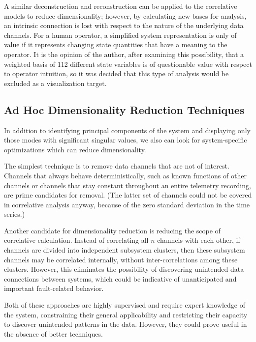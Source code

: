 A similar deconstruction and reconstruction can be applied to the correlative models to reduce dimensionality; however, by calculating new bases for analysis, an intrinsic connection is lost with respect to the nature of the underlying data channels. For a human operator, a simplified system representation is only of value if it represents changing state quantities that have a meaning to the operator. It is the opinion of the author, after examining this possibility, that a weighted basis of 112 different state variables is of questionable value with respect to operator intuition, so it was decided that this type of analysis would be excluded as a visualization target.

\subsection{Ad Hoc Dimensionality Reduction Techniques}

In addition to identifying principal components of the system and displaying only those modes with significant singular values, we also can look for system-specific optimizations which can reduce dimensionality.

The simplest technique is to remove data channels that are not of interest. Channels that always behave deterministically, such as known functions of other channels or channels that stay constant throughout an entire telemetry recording, are prime candidates for removal. (The latter set of channels could not be covered in correlative analysis anyway, because of the zero standard deviation in the time series.)

Another candidate for dimensionality reduction is reducing the scope of correlative calculation. Instead of correlating all $n$ channels with each other, if channels are divided into independent subsystem clusters, then these subsystem channels may be correlated internally, without inter-correlations among these clusters. However, this eliminates the possibility of discovering unintended data connections between systems, which could be indicative of unanticipated and important fault-related behavior.

Both of these approaches are highly supervised and require expert knowledge of the system, constraining their general applicability and restricting their capacity to discover unintended patterns in the data. However, they could prove useful in the absence of better techniques.


